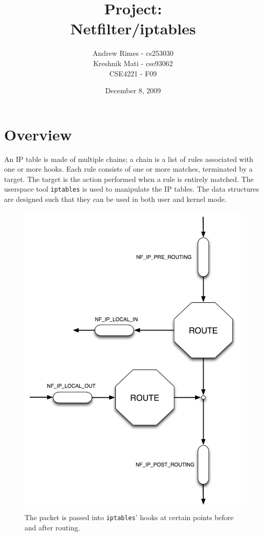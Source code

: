 \documentclass[a4paper,10pt]{article}
\newcommand{\code}[1]{\texttt{{#1}}}
\begin{document}
\title{\textbf{Project}:\\Netfilter/iptables}
\author{Andrew Rimes - cs253030\\Kreshnik Mati - cse93062\\CSE4221 - F09}
\date{December 8, 2009}

\maketitle
\thispagestyle{empty} 

\newpage

\setcounter{tocdepth}{3}
\tableofcontents


\newpage
\raggedright

\section{Overview}

An IP table is made of multiple chains; a chain is a list of rules associated 
with one or more hooks. Each rule consists of one or more matches, 
terminated by a target. The target is the action performed when a rule
is entirely matched. The userspace tool \code{iptables} is used to manipulate the IP tables. The data structures are designed such that they can be used in both user and kernel mode.


\begin{figure}
\centering
\includegraphics[totalheight=0.40\textheight]{images/hooks.png}
\caption{The packet is passed into \code{iptables}' hooks at certain points
  before and after routing.}\label{fig:hooks}
\end{figure}
\end{document}
